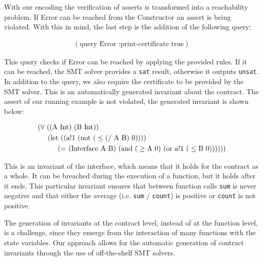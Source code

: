 With our encoding the verification of asserts is transformed into a reachability problem. If Error can be reached from the Constructor an assert is being violated. With this in mind, the last step is the addition of the following query:

\begin{align*}
(\text{query Error :print-certificate true})
\end{align*}

This query checks if Error can be reached by applying the provided rules. If it can be reached, the SMT solver provides a \texttt{sat} result, otherwise it outputs \texttt{unsat}. In addition to the query, we also require the certificate to be provided by the SMT solver. This is an automatically generated invariant about the contract. The assert of our running example is not violated, the generated invariant is shown below:

\begin{align*}
& (\forall \text{ ((A Int) } \text{(B Int))} \\
& \hspace{0.5cm} \text{(let } \text{((a!1 (not (} \leq \text{(/ A B) 0))))} \\
& \hspace{1cm} \text{(= (Interface A B) (and (} \geq \text{A 0) (or a!1 (} \leq \text{B 0))}\text{))))}
\end{align*}

This is an invariant of the interface, which means that it holds for the contract as a whole. It can be breached during the execution of a function, but it holds after it ends. This particular invariant ensures that between function calls \texttt{sum} is never negative and that either the average (i.e. \texttt{sum} / \texttt{count}) is positive or \texttt{count} is not positive.

The generation of invariants at the contract level, instead of at the function level, is a challenge, since they emerge from the interaction of many functions with the state variables. Our approach allows for the automatic generation of contract invariants through the use of off-the-shelf SMT solvers.

